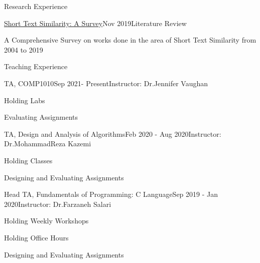 \documentclass{resume} %
\begin{document}
	\begin{rSection}{Research Experience}
		
			\begin{rSubsection}{\href{https://www.researchgate.net/publication/337632914_Short_Text_Similarity_A_Survey}{\textcolor{coolblack}{Short Text Similarity: A Survey}}}{Nov 2019}{Literature Review}{ }
		\item A Comprehensive Survey on works done in the area of Short Text Similarity from 2004 to 2019
	\end{rSubsection}
	\end{rSection}
	\begin{rSection}{Teaching Experience}
		\begin{rSubsection}{TA, COMP1010}{Sep 2021- Present}{Instructor: Dr.Jennifer Vaughan}{ }
			\item Holding Labs
			\item Evaluating Assignments
		\end{rSubsection}				
		\begin{rSubsection}{TA, Design and Analysis of Algorithms}{Feb 2020 - Aug 2020}{Instructor: Dr.MohammadReza Kazemi}{ }
		\item Holding Classes
		\item Designing and Evaluating Assignments
		\end{rSubsection}				
		\begin{rSubsection}{Head TA, Fundamentals of Programming: C Language}{Sep 2019 - Jan 2020}{Instructor: Dr.Farzaneh Salari}{ }
		\item Holding Weekly Workshops
		\item Holding Office Hours
		\item Designing and Evaluating Assignments
		

\end{rSubsection}
\end{rSection}
\end{document}
